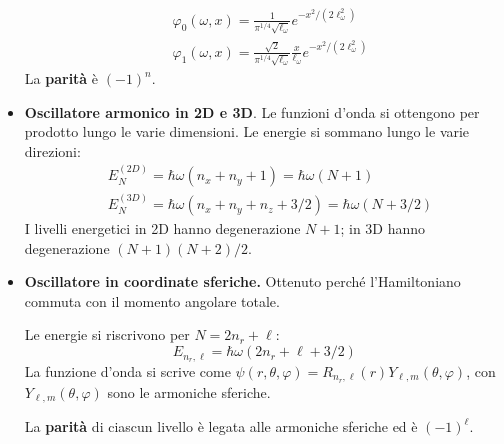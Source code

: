 \documentclass[11pt, a4paper]{scrartcl} %
\numberwithin{equation}{section}
\theoremstyle{style2}
\theoremstyle{style1}
\begin{document}
\begin{multicols}{2}
\begin{itemize}
	\begin{equation}
		\begin{split}
			&\varphi _0(\omega , x) = \frac{1}{\pi^{1 / 4} \sqrt{\ell _\omega}  } e^{- x^2 / (2\ell _\omega^2)} \\ 
			&\varphi _1 (\omega , x) = \frac{\sqrt{2} }{\pi^{1 / 4} \sqrt{\ell _\omega}  } \frac{x}{\ell _\omega} e^{- x^2 / (2\ell _\omega^2)} 
		\end{split}
	\end{equation}
	La \textbf{parit\`a} \`e $(-1)^n$.
	\item {\sffamily \bfseries Oscillatore armonico in 2D e 3D}. Le funzioni d'onda si ottengono per prodotto lungo le varie dimensioni. 
		Le energie si sommano lungo le varie direzioni:
		\begin{equation*}
			\begin{split}
				&E_N ^{(2D)} = \hbar \omega ( n_x + n_y + 1 )  = \hbar \omega (N + 1) \\
				& E_N ^{(3D)}  = \hbar \omega (n_x + n_y + n_z + 3/2) = \hbar \omega ( N + 3 / 2)
			\end{split}
		\end{equation*}
		I livelli energetici in 2D hanno degenerazione $N+1$; in 3D hanno degenerazione $(N+1)(N+2) / 2$.
		\item {\sffamily \bfseries Oscillatore in coordinate sferiche.} 
Ottenuto perch\'e l'Hamiltoniano commuta con il momento angolare totale.

Le energie si riscrivono per $N = 2n_r + \ell $:
\begin{equation}
	E_{n_r,\ell } = \hbar \omega (2n_r + \ell  + 3 / 2)
\end{equation}
La funzione d'onda si scrive come $\psi (r,\theta ,\varphi ) = R_{n_r , \ell }(r) Y_{\ell ,m} (\theta ,\varphi ) $, con $Y_{\ell ,m} (\theta ,\varphi )$ sono le armoniche sferiche.

La \textbf{parit\`a} di ciascun livello \`e legata alle armoniche sferiche ed \`e $(-1)^{\ell } $.
\end{itemize}	
\end{multicols}
\end{document}
